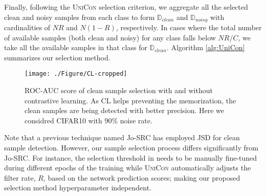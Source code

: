 \documentclass[10pt,twocolumn,letterpaper]{article}
\begin{document}
Finally, following the \textsc{UniCon} selection criterion, we aggregate all the selected clean and noisy samples from each class to form $\mathbb{D}_{clean}$ and $\mathbb{D}_{noisy}$ with cardinalities of $NR$ and $N(1-R)$, respectively. In cases where the total number of available samples (both clean and noisy) for any class falls below $NR/C$, we take all the available samples in that class for $\mathbb{D}_{clean}$. Algorithm \ref{alg:UniCon} summarizes our selection method.        
\begin{figure}[t]
\vspace{2mm}
\centering
\texttt{[image: ./Figure/CL-cropped]}
\vspace{-2mm}
\caption{ROC-AUC score of clean sample selection with and without contrastive learning. As CL helps preventing the memorization, the clean samples are being detected with better precision. Here we considred CIFAR10 with 90\% noise rate. 
}
\label{fig:precision_con}
\vspace{-1mm}
\end{figure}
Note that a previous technique named Jo-SRC \cite{yao2021jo} has employed JSD for clean sample detection. However, our sample selection process differs significantly from Jo-SRC. For instance, the selection threshold in \cite{yao2021jo} needs to be manually fine-tuned during different epochs of the training while \textsc{UniCon} automatically adjusts the filter rate, $R$, based on the network prediction scores; making our proposed selection method hyperparameter independent. 
\end{document}
